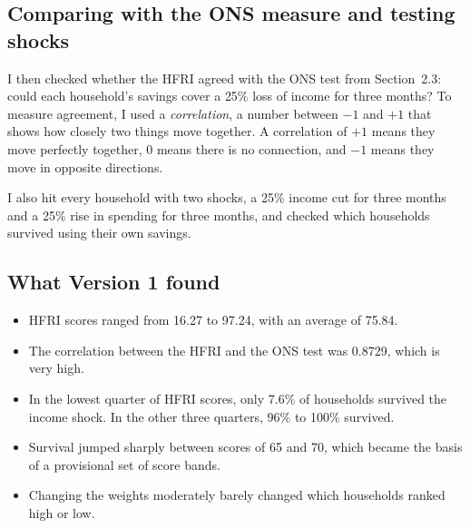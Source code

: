 \documentclass[11pt,a4paper]{article}
\newcommand{\pct}{\%}
\begin{document}
\subsection{Comparing with the ONS measure and testing shocks}
I then checked whether the HFRI agreed with the ONS test from Section~2.3: could each household's savings cover a 25\pct{}
loss of income for three months? To measure agreement, I used a \emph{correlation}, a number between $-1$ and $+1$
that shows how closely two things move together. A correlation of $+1$ means they move perfectly together, 0 means
there is no connection, and $-1$ means they move in opposite directions.

I also hit every household with two shocks, a 25\pct{} income cut for three months and a 25\pct{} rise in spending for
three months, and checked which households survived using their own savings.

\subsection{What Version 1 found}
\begin{itemize}
\item HFRI scores ranged from 16.27 to 97.24, with an average of 75.84.
\item The correlation between the HFRI and the ONS test was 0.8729, which is very high.
\item In the lowest quarter of HFRI scores, only 7.6\pct{} of households survived the income shock. In the other three
quarters, 96\pct{} to 100\pct{} survived.
\item Survival jumped sharply between scores of 65 and 70, which became the basis of a provisional set of score bands.
\item Changing the weights moderately barely changed which households ranked high or low.
\end{itemize}
\end{document}
